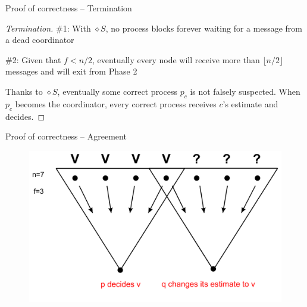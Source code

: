 \begin{frame}{Proof of correctness -- Termination}

\begin{proof}[Termination]	
\BI
\item \WAIT \#1: With $\diamond S$, no process blocks forever waiting for a message 
  from a dead coordinator
\item \WAIT \#2: Given that $f<n/2$, eventually every node will receive more
than $\lfloor n/2 \rfloor$ messages and will exit from Phase 2
\item Thanks to $\diamond S$, eventually some correct process $p_c$ is not falsely 
  suspected. When $p_c$ becomes the coordinator, every correct process receives $c$'s 
  estimate and decides.
\EI
\end{proof}

\end{frame}


\begin{frame}{Proof of correctness -- Agreement}


\begin{figure}
	\includegraphics[width=\textwidth]{figs/07/agreement}
\end{figure}

\end{frame}

